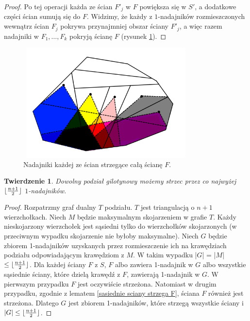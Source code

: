\documentclass{xmgr}
\DeclarePairedDelimiter\floor{\lfloor}{\rfloor}
\newtheorem{Twierdzenie}{Twierdzenie}
\theoremstyle{definition}
\begin{document}
\begin{proof}
Po tej operacji każda ze ścian $F'_j$ w $F$ powiększa się w $S'$, a dodatkowe części ścian sumują się do $F$. Widzimy, że każdy z $1$-nadajników rozmieszczonych wewnątrz ścian $F_j$ pokrywa przynajmniej obszar ściany $F'_j$, a więc razem nadajniki w $F_1,\ldots,F_k$ pokryją ścianę $F$ (rysunek \ref{fig:pokrycie f}).
\end{proof}

\begin{figure}[ht!]
  \centering
  \includegraphics[width=9cm,height=6cm]{rysunki/pokrycie_f.png}
  \caption{Nadajniki każdej ze ścian strzegące całą ścianę $F$.}
  \label{fig:pokrycie f}
\end{figure} 

\begin{Twierdzenie} \cite{knadajniki}
  Dowolny podział gilotynowy możemy strzec przez co najwyżej $\floor{\frac{n+1}{2}}$ $1$-nadajników.
\end{Twierdzenie}
\begin{proof}
	Rozpatrzmy graf dualny $T$ podziału. $T$ jest triangulacją o $n + 1$ wierzchołkach. Niech $M$ będzie maksymalnym skojarzeniem w grafie $T$. Każdy nieskojarzony wierzchołek jest sąsiedni tylko do wierzchołków skojarzonych (w przeciwnym wypadku skojarzenie nie byłoby maksymalne). Niech $G$ będzie zbiorem 1-nadajników uzyskanych przez rozmieszczenie ich na krawędziach podziału odpowiadającym krawędziom z $M$. W takim wypadku |$G$| = |$M$| $\le \floor{\frac{n+1}{2}}$. Dla każdej ściany $F$ z $S$, $F$ albo zawiera 1-nadajnik w $G$ albo wszystkie sąsiednie ściany, które dzielą krawędź z $F$, zawierają 1-nadajnik w $G$. W pierwszym przypadku $F$ jest oczywiście strzeżona. Natomiast w drugim przypadku, zgodnie z lematem \ref{sasiednie sciany strzega F}, ściana $F$ również jest strzeżona. Dlatego $G$ jest zbiorem 1-nadajników, które strzegą wszystkie ściany i $|G| \le \floor{\frac{n+1}{2}}$.
\end{proof}
\end{document}
